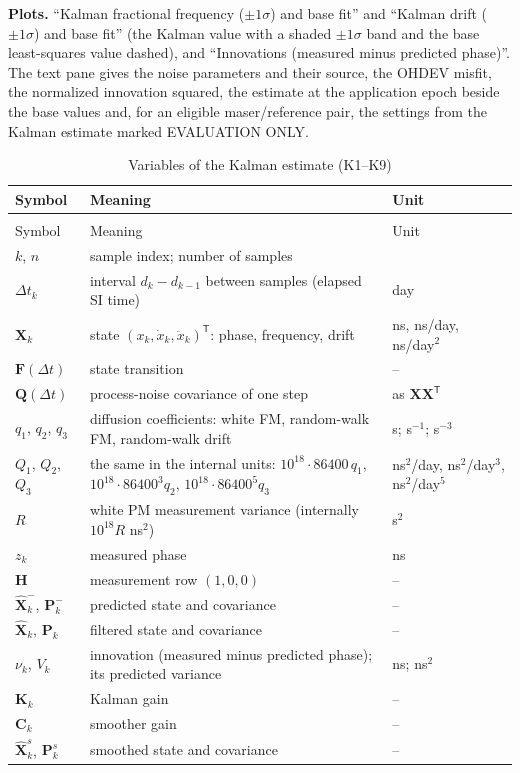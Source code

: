 \documentclass[11pt,a4paper]{article}
\makeatletter
\renewcommand{\_}{\usscore\allowbreak}
\newenvironment{vartable}[2]{%
 \par\small\setlength{\LTpre}{3pt}\setlength{\LTpost}{3pt}%
 \begin{longtable}{@{}>{\raggedright}p{.2\linewidth}>{\raggedright}p{.57\linewidth}>{\raggedright\arraybackslash}p{.17\linewidth}@{}}
 \caption{#2}\label{#1}\\
 \toprule Symbol & Meaning & Unit\\\midrule
 \endfirsthead
 \multicolumn{3}{@{}l}{\footnotesize\itshape Table \thetable{} (continued)}\\
 \toprule Symbol & Meaning & Unit\\\midrule
 \endhead
 \bottomrule
 \endlastfoot}
 {\end{longtable}\normalsize}
\makeatother
\begin{document}
\textbf{Plots.} ``Kalman fractional frequency (\(\pm1\sigma\)) and base fit'' and ``Kalman drift
(\(\pm1\sigma\)) and base fit'' (the Kalman value with a shaded \(\pm1\sigma\) band and the base
least-squares value dashed), and ``Innovations (measured minus predicted phase)''. The text pane gives
the noise parameters and their source, the OHDEV misfit, the normalized innovation squared, the estimate
at the application epoch beside the base values and, for an eligible maser/reference pair, the settings
from the Kalman estimate marked EVALUATION ONLY.

\begin{vartable}{tab:var-K}{Variables of the Kalman estimate (K1--K9)}
\(k\), \(n\) & sample index; number of samples & 1\\
\(\Delta t_k\) & interval \(d_k-d_{k-1}\) between samples (elapsed SI time) & day\\
\(\mathbf X_k\) & state \((x_k,\dot x_k,\ddot x_k)^{\mathsf T}\): phase, frequency, drift & ns, ns/day, ns/day\(^2\)\\
\(\mathbf F(\Delta t)\) & state transition & --\\
\(\mathbf Q(\Delta t)\) & process-noise covariance of one step & as \(\mathbf X\mathbf X^{\mathsf T}\)\\
\(q_1\), \(q_2\), \(q_3\) & diffusion coefficients: white FM, random-walk FM, random-walk drift & s; s\(^{-1}\); s\(^{-3}\)\\
\(Q_1\), \(Q_2\), \(Q_3\) & the same in the internal units: \(10^{18}\cdot86400\,q_1\), \(10^{18}\cdot86400^3q_2\), \(10^{18}\cdot86400^5q_3\) & ns\(^2\)/day, ns\(^2\)/day\(^3\), ns\(^2\)/day\(^5\)\\
\(R\) & white PM measurement variance (internally \(10^{18}R\) ns\(^2\)) & s\(^2\)\\
\(z_k\) & measured phase & ns\\
\(\mathbf H\) & measurement row \((1,0,0)\) & --\\
\(\hat{\mathbf X}_k^-\), \(\mathbf P_k^-\) & predicted state and covariance & --\\
\(\hat{\mathbf X}_k\), \(\mathbf P_k\) & filtered state and covariance & --\\
\(\nu_k\), \(V_k\) & innovation (measured minus predicted phase); its predicted variance & ns; ns\(^2\)\\
\(\mathbf K_k\) & Kalman gain & --\\
\(\mathbf C_k\) & smoother gain & --\\
\(\hat{\mathbf X}_k^s\), \(\mathbf P_k^s\) & smoothed state and covariance & --\\

\end{vartable}
\end{document}
